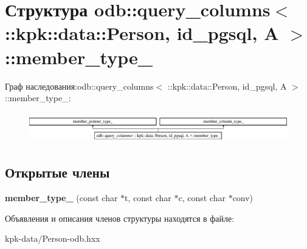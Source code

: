 \hypertarget{structodb_1_1query__columns_3_01_1_1kpk_1_1data_1_1_person_00_01id__pgsql_00_01_a_01_4_1_1member__type__}{}\section{Структура odb\+:\+:query\+\_\+columns$<$ \+:\+:kpk\+:\+:data\+:\+:Person, id\+\_\+pgsql, A $>$\+:\+:member\+\_\+type\+\_\+}
\label{structodb_1_1query__columns_3_01_1_1kpk_1_1data_1_1_person_00_01id__pgsql_00_01_a_01_4_1_1member__type__}
Граф наследования\+:odb\+:\+:query\+\_\+columns$<$ \+:\+:kpk\+:\+:data\+:\+:Person, id\+\_\+pgsql, A $>$\+:\+:member\+\_\+type\+\_\+\+:\begin{figure}[H]
\begin{center}
\leavevmode
\includegraphics[height=1.339713cm]{structodb_1_1query__columns_3_01_1_1kpk_1_1data_1_1_person_00_01id__pgsql_00_01_a_01_4_1_1member__type__}
\end{center}
\end{figure}
\subsection*{Открытые члены}
\begin{DoxyCompactItemize}
\item 
{\bfseries member\+\_\+type\+\_\+} (const char $\ast$t, const char $\ast$c, const char $\ast$conv)\hypertarget{structodb_1_1query__columns_3_01_1_1kpk_1_1data_1_1_person_00_01id__pgsql_00_01_a_01_4_1_1member__type___a99d0c5998ad24a5ca10f42d73c543bb0}{}\label{structodb_1_1query__columns_3_01_1_1kpk_1_1data_1_1_person_00_01id__pgsql_00_01_a_01_4_1_1member__type___a99d0c5998ad24a5ca10f42d73c543bb0}

\end{DoxyCompactItemize}


Объявления и описания членов структуры находятся в файле\+:\begin{DoxyCompactItemize}
\item 
kpk-\/data/Person-\/odb.\+hxx\end{DoxyCompactItemize}
